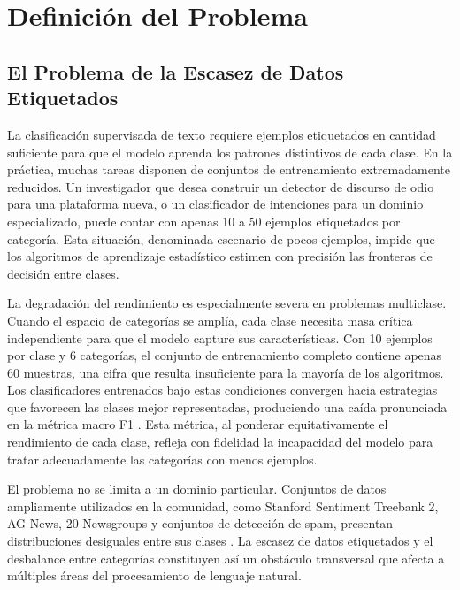 
\chapter{Definición del Problema}
\label{ch:problema}

\section{El Problema de la Escasez de Datos Etiquetados}

La clasificación supervisada de texto requiere ejemplos etiquetados en cantidad suficiente para que el modelo aprenda los patrones distintivos de cada clase. En la práctica, muchas tareas disponen de conjuntos de entrenamiento extremadamente reducidos. Un investigador que desea construir un detector de discurso de odio para una plataforma nueva, o un clasificador de intenciones para un dominio especializado, puede contar con apenas 10 a 50 ejemplos etiquetados por categoría. Esta situación, denominada escenario de pocos ejemplos, impide que los algoritmos de aprendizaje estadístico estimen con precisión las fronteras de decisión entre clases.

La degradación del rendimiento es especialmente severa en problemas multiclase. Cuando el espacio de categorías se amplía, cada clase necesita masa crítica independiente para que el modelo capture sus características. Con 10 ejemplos por clase y 6 categorías, el conjunto de entrenamiento completo contiene apenas 60 muestras, una cifra que resulta insuficiente para la mayoría de los algoritmos. Los clasificadores entrenados bajo estas condiciones convergen hacia estrategias que favorecen las clases mejor representadas, produciendo una caída pronunciada en la métrica macro F1 \cite{gopali2024applicability}. Esta métrica, al ponderar equitativamente el rendimiento de cada clase, refleja con fidelidad la incapacidad del modelo para tratar adecuadamente las categorías con menos ejemplos.

El problema no se limita a un dominio particular. Conjuntos de datos ampliamente utilizados en la comunidad, como Stanford Sentiment Treebank 2, AG News, 20 Newsgroups y conjuntos de detección de spam, presentan distribuciones desiguales entre sus clases \cite{whitehouse2023llm}. La escasez de datos etiquetados y el desbalance entre categorías constituyen así un obstáculo transversal que afecta a múltiples áreas del procesamiento de lenguaje natural.

